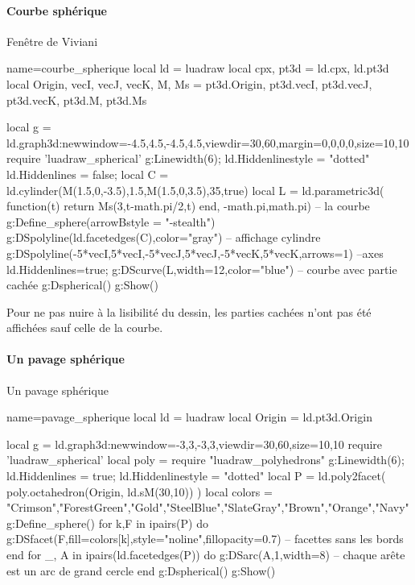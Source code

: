 \paragraph{Courbe sphérique}

\begin{demo}{Fenêtre de Viviani}
\begin{luadraw}{name=courbe_spherique}
local ld = luadraw
local cpx, pt3d = ld.cpx, ld.pt3d
local Origin, vecI, vecJ, vecK, M, Ms = pt3d.Origin, pt3d.vecI, pt3d.vecJ, pt3d.vecK, pt3d.M, pt3d.Ms

local g = ld.graph3d:new{window={-4.5,4.5,-4.5,4.5},viewdir={30,60},margin={0,0,0,0},size={10,10}}
require 'luadraw_spherical'
g:Linewidth(6); ld.Hiddenlinestyle = "dotted"
ld.Hiddenlines = false; 
local C = ld.cylinder(M(1.5,0,-3.5),1.5,M(1.5,0,3.5),35,true)
local L = ld.parametric3d( function(t) return Ms(3,t-math.pi/2,t) end, -math.pi,math.pi) -- la courbe
g:Define_sphere({arrowBstyle = "-stealth"})
g:DSpolyline(ld.facetedges(C),{color="gray"}) -- affichage cylindre
g:DSpolyline({{-5*vecI,5*vecI},{-5*vecJ,5*vecJ},{-5*vecK,5*vecK}},{arrows=1}) --axes
ld.Hiddenlines=true; g:DScurve(L,{width=12,color="blue"}) -- courbe avec partie cachée
g:Dspherical()
g:Show()
\end{luadraw}
\end{demo}

Pour ne pas nuire à la lisibilité du dessin, les parties cachées n'ont pas été affichées sauf celle de la courbe.

\paragraph{Un pavage sphérique}

\begin{demo}{Un pavage sphérique}
\begin{luadraw}{name=pavage_spherique}
local ld = luadraw
local Origin = ld.pt3d.Origin

local g = ld.graph3d:new{window={-3,3,-3,3},viewdir={30,60},size={10,10}}
require 'luadraw_spherical'
local poly = require "luadraw_polyhedrons"
g:Linewidth(6); ld.Hiddenlines = true; ld.Hiddenlinestyle = "dotted"
local P = ld.poly2facet( poly.octahedron(Origin, ld.sM(30,10)) )
local colors = {"Crimson","ForestGreen","Gold","SteelBlue","SlateGray","Brown","Orange","Navy"}
g:Define_sphere()
for k,F in ipairs(P) do
    g:DSfacet(F,{fill=colors[k],style="noline",fillopacity=0.7})  -- facettes sans les bords
end
for _, A in ipairs(ld.facetedges(P)) do
    g:DSarc(A,1,{width=8}) -- chaque arête est un arc de grand cercle
end
g:Dspherical()
g:Show()
\end{luadraw}
\end{demo}

